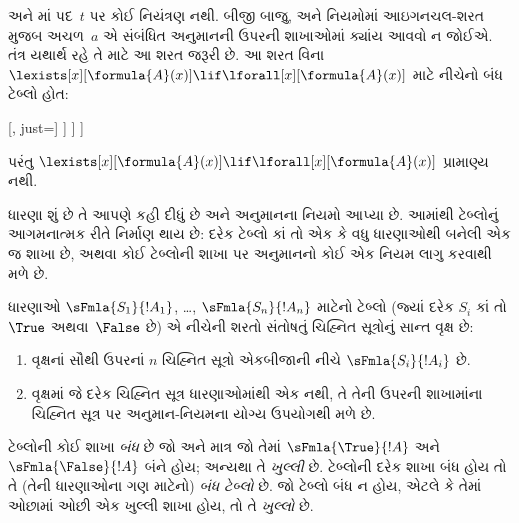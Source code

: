 \begin{explain}
\TRule{\True}{\lforall} અને \TRule{\False}{\lexists}માં પદ~$t$ પર કોઈ
નિયંત્રણ નથી. બીજી બાજુ, \TRule{\True}{\lexists} અને
\TRule{\False}{\lforall} નિયમોમાં આઇગનચલ-શરત મુજબ અચળ~$a$ એ
સંબંધિત અનુમાનની ઉપરની શાખાઓમાં ક્યાંય આવવો ન જોઈએ. તંત્ર યથાર્થ રહે
તે માટે આ શરત જરૂરી છે. આ શરત વિના
$\lexists[x][\formula{A}(x)] \lif \lforall[x][\formula{A}(x)]$ માટે
નીચેનો બંધ ટેબ્લો હોત:
\begin{center}
\begin{tableau}{}
  [\sFmla{\False}{\lexists[x][\formula{A}(x)] \lif \lforall[x][\formula{A}(x)]}, just=\TAss
    [\sFmla{\True}{\lexists[x][\formula{A}(x)]},
      just={\TRule{\False}{\lif}[1]}
      [\sFmla{\False}{\lforall[x][\formula{A}(x)]},
        just={\TRule{\False}{\lif}[1]}
        [\sFmla{\True}{\formula{A}(a)},
          just={\TRule{\True}{\lexists}[2]}
          [\sFmla{\False}{\formula{A}(a)},
            just={\TRule{\False}{\lforall}[3]}, close]
        ]
      ]
    ]
  ]
\end{tableau}
\end{center}
પરંતુ $\lexists[x][\formula{A}(x)] \lif
\lforall[x][\formula{A}(x)]$ પ્રામાણ્ય નથી.
\end{explain}
\endgroup


\begingroup
\makeatletter{}\makeatother


\label{guunit:OLP-0102}


\begin{explain}
ધારણા શું છે તે આપણે કહી દીધું છે અને અનુમાનના નિયમો આપ્યા છે. આમાંથી
ટેબ્લોનું આગમનાત્મક રીતે નિર્માણ થાય છે: દરેક ટેબ્લો કાં તો
એક કે વધુ ધારણાઓથી બનેલી એક જ શાખા છે, અથવા કોઈ ટેબ્લોની શાખા
પર અનુમાનનો કોઈ એક નિયમ લાગુ કરવાથી મળે છે.
\end{explain}

\begin{defn}[ટેબ્લો]
ધારણાઓ $\sFmla{S_1}{!A_1}$, \dots, $\sFmla{S_n}{!A_n}$ માટેનો
ટેબ્લો (જ્યાં દરેક $S_i$ કાં તો $\True$ અથવા~$\False$ છે) એ
નીચેની શરતો સંતોષતું ચિહ્નિત સૂત્રોનું સાન્ત વૃક્ષ છે:
\begin{enumerate}
\item વૃક્ષનાં સૌથી ઉપરનાં $n$ ચિહ્નિત સૂત્રો એકબીજાની નીચે
  $\sFmla{S_i}{!A_i}$ છે.
\item વૃક્ષમાં જે દરેક ચિહ્નિત સૂત્ર ધારણાઓમાંથી એક નથી, તે તેની
  ઉપરની શાખામાંના ચિહ્નિત સૂત્ર પર અનુમાન-નિયમના યોગ્ય ઉપયોગથી
  મળે છે.
\end{enumerate}
ટેબ્લોની કોઈ શાખા \emph{બંધ} છે જો અને માત્ર જો તેમાં
$\sFmla{\True}{!A}$ અને~$\sFmla{\False}{!A}$ બંને હોય; અન્યથા તે
\emph{ખુલ્લી} છે. ટેબ્લોની દરેક શાખા બંધ હોય તો તે (તેની
ધારણાઓના ગણ માટેનો) \emph{બંધ ટેબ્લો} છે. જો ટેબ્લો બંધ ન
હોય, એટલે કે તેમાં ઓછામાં ઓછી એક ખુલ્લી શાખા હોય, તો તે \emph{ખુલ્લો}
છે.
\end{defn}

